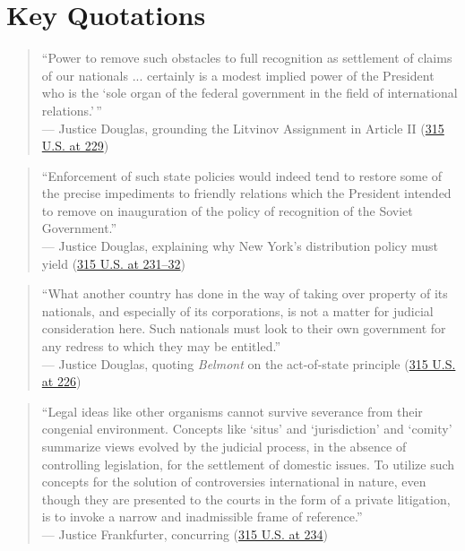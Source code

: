 \documentclass[12pt]{article}
\begin{document}
\section{Key Quotations}
\begin{quote}
``Power to remove such obstacles to full recognition as settlement of claims of our nationals ... certainly is a modest implied power of the President who is the `sole organ of the federal government in the field of international relations.'\,''\\
--- Justice Douglas, grounding the Litvinov Assignment in Article II (\href{https://www.law.cornell.edu/supremecourt/text/315/203}{315 U.S. at 229})
\end{quote}

\begin{quote}
``Enforcement of such state policies would indeed tend to restore some of the precise impediments to friendly relations which the President intended to remove on inauguration of the policy of recognition of the Soviet Government.''\\
--- Justice Douglas, explaining why New York's distribution policy must yield (\href{https://caselaw.findlaw.com/court/us-supreme-court/315/203.html}{315 U.S. at 231--32})
\end{quote}

\begin{quote}
``What another country has done in the way of taking over property of its nationals, and especially of its corporations, is not a matter for judicial consideration here. Such nationals must look to their own government for any redress to which they may be entitled.''\\
--- Justice Douglas, quoting \textit{Belmont} on the act-of-state principle (\href{https://supreme.justia.com/cases/federal/us/315/203/}{315 U.S. at 226})
\end{quote}

\begin{quote}
``Legal ideas like other organisms cannot survive severance from their congenial environment. Concepts like `situs' and `jurisdiction' and `comity' summarize views evolved by the judicial process, in the absence of controlling legislation, for the settlement of domestic issues. To utilize such concepts for the solution of controversies international in nature, even though they are presented to the courts in the form of a private litigation, is to invoke a narrow and inadmissible frame of reference.''\\
--- Justice Frankfurter, concurring (\href{https://caselaw.findlaw.com/court/us-supreme-court/315/203.html}{315 U.S. at 234})
\end{quote}
\end{document}
